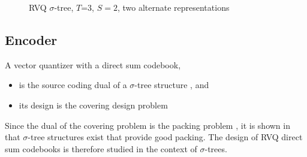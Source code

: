 \begin{figure}[ht]
	\centering	
	\caption{RVQ $\sigma$-tree, $T$=3, $S=2$, two alternate representations} 
	\label{fig:RVQ_sigma_tree}				
\end{figure}


\subsection{Encoder}
A vector quantizer with a direct sum codebook,

\begin{itemize}
\item is the source coding dual of a $\sigma$-tree structure \cite{1993_sigmaTrees_Barnes}, and
\item its design is the covering design problem
\end{itemize}

Since the dual of the covering problem is the packing problem \cite{BOOK_spheres_Conway}, it is shown in \cite{1993_sigmaTrees_Barnes} that $\sigma$-tree structures exist that provide good packing.  The design of RVQ direct sum codebooks is therefore studied in the context of $\sigma$-trees.

